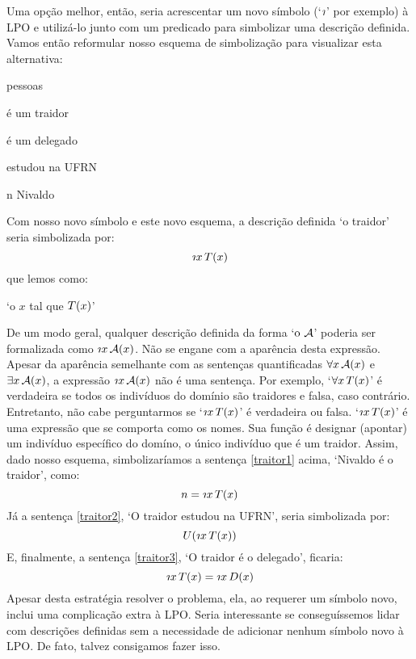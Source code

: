 Uma opção melhor, então, seria acrescentar um novo símbolo (`$\maththe$' por exemplo) à LPO e utilizá-lo junto com um predicado  para simbolizar uma descrição definida.
Vamos então reformular nosso esquema de simbolização para visualizar esta alternativa:
\begin{center}
	\begin{ekey}
		\item[\text{domínio}] pessoas
		\item[\atom{T}{x}]  é um traidor
		\item[\atom{D}{x}]  é um delegado
		\item[\atom{U}{x}]  estudou na UFRN
		\item[n] Nivaldo
	\end{ekey}
\end{center}
Com nosso novo símbolo e este novo esquema, a descrição definida `o traidor' seria simbolizada por:
$$\maththe x\, \atom{T}{x}$$
que lemos como:
\begin{center}
	`o $x$ tal que $\mathord{T}(x)$'
\end{center}
De um modo geral, qualquer descrição definida da forma `$\text{o}\ \mathcal{A}$' poderia ser formalizada como
$\maththe x\, \atom{\meta{A}}{x}$.
Não se engane com a aparência desta expressão.
Apesar da aparência semelhante com as sentenças quantificadas $\forall x\, \mathord{\mathcal{A}}(x)$ e $\exists x\, \mathord{\mathcal{A}}(x)$, a expressão $\maththe x\, \atom{\meta{A}}{x}$ não é uma sentença.
Por exemplo, `$\forall x\, \mathord{T}(x)$' é verdadeira se todos os indivíduos do domínio são traidores e falsa, caso contrário.
Entretanto, não cabe perguntarmos se  `$\maththe x\, \atom{T}{x}$' é verdadeira ou falsa.
`$\maththe x\, \atom{T}{x}$' é uma expressão que se comporta como os nomes.
Sua função é designar (apontar) um indivíduo específico do domíno, o único indivíduo que é um traidor.
Assim, dado nosso esquema, simbolizaríamos a sentença \ref{traitor1} acima, `Nivaldo é o traidor', como:
$$n = \maththe x\, \atom{T}{x}$$
Já a sentença \ref{traitor2}, `O traidor estudou na UFRN', seria simbolizada por:
$$\atom{U}{\maththe x\,\atom{T}{x}}$$
E, finalmente, a sentença \ref{traitor3}, `O traidor é o delegado', ficaria:
$$\maththe x\, \atom{T}{x} = \maththe x\, \atom{D}{x}$$
Apesar desta estratégia resolver o problema, ela, ao requerer um símbolo novo, inclui uma complicação extra à LPO.
Seria interessante se conseguíssemos lidar com descrições definidas sem a necessidade de adicionar nenhum símbolo novo à LPO.
De fato, talvez consigamos fazer isso.


